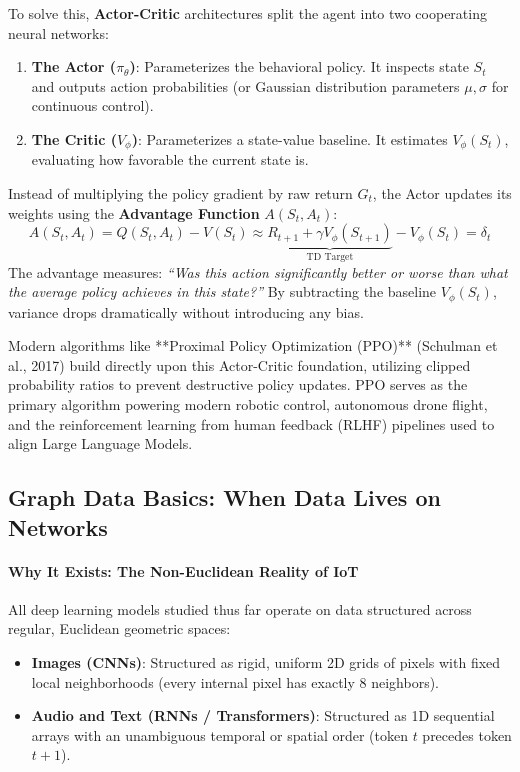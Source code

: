 To solve this, \textbf{Actor-Critic} architectures split the agent into two cooperating neural networks:
\begin{enumerate}
    \item \textbf{The Actor ($\pi_\theta$)}: Parameterizes the behavioral policy. It inspects state $S_t$ and outputs action probabilities (or Gaussian distribution parameters $\mu, \sigma$ for continuous control).
    \item \textbf{The Critic ($V_\phi$)}: Parameterizes a state-value baseline. It estimates $V_\phi(S_t)$, evaluating how favorable the current state is.
\end{enumerate}

Instead of multiplying the policy gradient by raw return $G_t$, the Actor updates its weights using the \textbf{Advantage Function} $A(S_t, A_t)$:
\begin{equation}
A(S_t, A_t) = Q(S_t, A_t) - V(S_t) \approx \underbrace{R_{t+1} + \gamma V_\phi(S_{t+1})}_{\text{TD Target}} - V_\phi(S_t) = \delta_t\label{eq:advantage_td}
\end{equation}
The advantage measures: \emph{``Was this action significantly better or worse than what the average policy achieves in this state?''} By subtracting the baseline $V_\phi(S_t)$, variance drops dramatically without introducing any bias. 

Modern algorithms like **Proximal Policy Optimization (PPO)** (Schulman et al., 2017) build directly upon this Actor-Critic foundation, utilizing clipped probability ratios to prevent destructive policy updates. PPO serves as the primary algorithm powering modern robotic control, autonomous drone flight, and the reinforcement learning from human feedback (RLHF) pipelines used to align Large Language Models.

\subsection{Graph Data Basics: When Data Lives on Networks}\label{subsec:graph_basics}

\paragraph{Why It Exists: The Non-Euclidean Reality of IoT}
All deep learning models studied thus far operate on data structured across regular, Euclidean geometric spaces:
\begin{itemize}
    \item \textbf{Images (CNNs)}: Structured as rigid, uniform 2D grids of pixels with fixed local neighborhoods (every internal pixel has exactly 8 neighbors).
    \item \textbf{Audio and Text (RNNs / Transformers)}: Structured as 1D sequential arrays with an unambiguous temporal or spatial order (token $t$ precedes token $t+1$).
\end{itemize}

